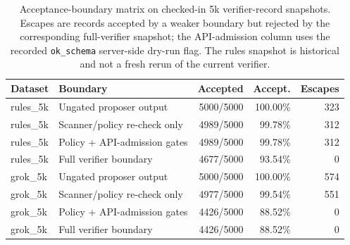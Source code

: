 \begin{table}[t]
\centering
\scriptsize
\caption{Acceptance-boundary matrix on checked-in 5k verifier-record snapshots. Escapes are records accepted by a weaker boundary but rejected by the corresponding full-verifier snapshot; the API-admission column uses the recorded \texttt{ok\_schema} server-side dry-run flag. The rules snapshot is historical and not a fresh rerun of the current verifier.}
\label{tab:verifier_ablation}
\begin{tabular}{@{}l l r r r@{}}
\toprule
\textbf{Dataset} & \textbf{Boundary} & \textbf{Accepted} & \textbf{Accept.} & \textbf{Escapes} \\
\midrule
rules\_5k & Ungated proposer output & 5000/5000 & 100.00\% & 323 \\
rules\_5k & Scanner/policy re-check only & 4989/5000 & 99.78\% & 312 \\
rules\_5k & Policy + API-admission gates & 4989/5000 & 99.78\% & 312 \\
rules\_5k & Full verifier boundary & 4677/5000 & 93.54\% & 0 \\
\midrule
grok\_5k & Ungated proposer output & 5000/5000 & 100.00\% & 574 \\
grok\_5k & Scanner/policy re-check only & 4977/5000 & 99.54\% & 551 \\
grok\_5k & Policy + API-admission gates & 4426/5000 & 88.52\% & 0 \\
grok\_5k & Full verifier boundary & 4426/5000 & 88.52\% & 0 \\
\bottomrule
\end{tabular}
\end{table}
